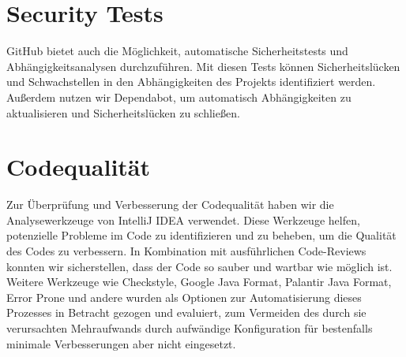 \section{Security Tests}
GitHub bietet auch die Möglichkeit, automatische Sicherheitstests und Abhängigkeitsanalysen durchzuführen.
Mit diesen Tests können Sicherheitslücken und Schwachstellen in den Abhängigkeiten des Projekts identifiziert werden.
Außerdem nutzen wir Dependabot, um automatisch Abhängigkeiten zu aktualisieren und Sicherheitslücken zu schließen.

\section{Codequalität}
Zur Überprüfung und Verbesserung der Codequalität haben wir die Analysewerkzeuge von IntelliJ IDEA verwendet.
Diese Werkzeuge helfen, potenzielle Probleme im Code zu identifizieren und zu beheben, um die Qualität des Codes zu verbessern.
In Kombination mit ausführlichen Code-Reviews konnten wir sicherstellen, dass der Code so sauber und wartbar wie möglich ist.
Weitere Werkzeuge wie Checkstyle, Google Java Format, Palantir Java Format, Error Prone und andere
wurden als Optionen zur Automatisierung dieses Prozesses in Betracht gezogen und evaluiert,
zum Vermeiden des durch sie verursachten Mehraufwands durch aufwändige Konfiguration für bestenfalls minimale Verbesserungen aber nicht eingesetzt.
